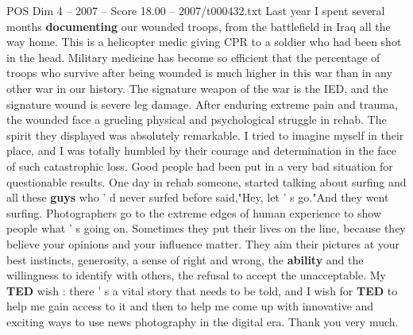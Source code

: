\begin{textsample}{POS Dim 4 – 2007 – Score 18.00 – 2007/t000432.txt}
Last year I spent several months \textbf{documenting} our wounded troops, from the battlefield in Iraq all the way home.
This is a helicopter medic giving CPR to a soldier who had been shot in the head.
Military medicine has become so efficient that the percentage of troops who survive after being wounded is much higher in this war than in any other war in our history.
The signature weapon of the war is the IED, and the signature wound is severe leg damage.
After enduring extreme pain and trauma, the wounded face a grueling physical and psychological struggle in rehab.
The spirit they displayed was absolutely remarkable.
I tried to imagine myself in their place, and I was totally humbled by their courage and determination in the face of such catastrophic loss.
Good people had been put in a very bad situation for questionable results.
One day in rehab someone, started talking about surfing and all these \textbf{guys} who ' d never surfed before said,"Hey, let ' s go."And they went surfing.
Photographers go to the extreme edges of human experience to show people what ' s going on.
Sometimes they put their lives on the line, because they believe your opinions and your influence matter.
They aim their pictures at your best instincts, generosity, a sense of right and wrong, the \textbf{ability} and the willingness to identify with others, the refusal to accept the unacceptable.
My \textbf{TED} wish : there ' s a vital story that needs to be told, and I wish for \textbf{TED} to help me gain access to it and then to help me come up with innovative and exciting ways to use news photography in the digital era.
Thank you very much.

\end{textsample}
